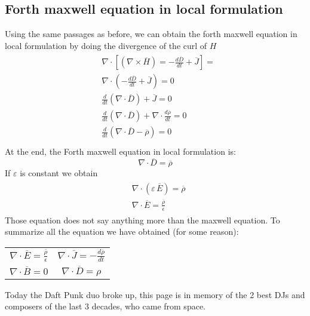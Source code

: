 \subsection*{Forth maxwell equation in local formulation}
Using the same passages as before, we can obtain the forth maxwell equation in local formulation by doing the divergence of the curl of $H$
\begin{align}
    \begin{split}
        &\nabla \cdot \left[ (\nabla\times \overline{H})=-\frac{d\overline{D}}{dt}+\overline{J}\right]=\\[5pt]
        &\nabla \cdot \left(-\frac{d\overline{D}}{dt}+\overline{J}\right)=0\\[5pt]
        &\frac{d}{dt}(\nabla\cdot \overline{D})+ \overline{J}=0\\[5pt]
        &\frac{d}{dt}(\nabla\cdot \overline{D})+\nabla\cdot \frac{d\overline\rho}{dt}=0\\[5pt]
        &\frac{d}{dt}\left(\nabla\cdot\overline{D}-\overline{\rho}\right)=0\\[5pt]
    \end{split}
\end{align}
At the end, the Forth maxwell equation in local formulation is:
\begin{equation}
    \nabla\cdot\overline{D}=\overline{\rho}
\end{equation}
If $\varepsilon$ is constant we obtain
\begin{align}
    \begin{split}
        &\nabla\cdot(\varepsilon\,\overline{E})=\overline{\rho}\\[5pt]
        &\nabla\cdot\overline{E}=\frac{\overline{\rho}}{\epsilon}
    \end{split}
\end{align}
Those equation does not say anything more than the maxwell equation.
To summarize all the equation we have obtained (for some reason):
\begin{center}
\begin{tabular}{ c c }
    $\nabla\cdot\overline{E}=\frac{\overline{\rho}}{\epsilon}$&$\nabla\cdot\overline{J}=-\frac{d\overline{\rho}}{dt}$\\[5pt]
    $\nabla\cdot\overline{B}=0$&$\nabla\cdot\overline{D}=\rho$
\end{tabular}
\end{center}
\vspace*{\fill}
Today the Daft Punk duo broke up, this page is in memory of the 2 best DJs and composers of the last 3 decades, who came from space.